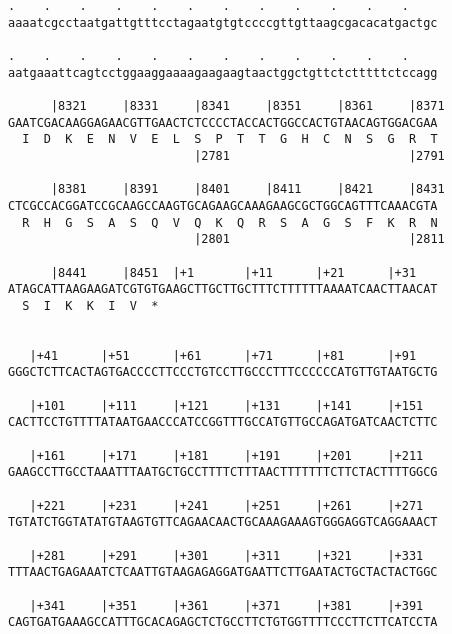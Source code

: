 \documentclass{article}
\begin{document}
\begin{Verbatim}
.    .    .    .    .    .    .    .    .    .    .    .    
aaaatcgcctaatgattgtttcctagaatgtgtccccgttgttaagcgacacatgactgc
                                                            
.    .    .    .    .    .    .    .    .    .    .    .    
aatgaaattcagtcctggaaggaaaagaagaagtaactggctgttctctttttctccagg
                                                            
      |8321     |8331     |8341     |8351     |8361     |8371
GAATCGACAAGGAGAACGTTGAACTCTCCCCTACCACTGGCCACTGTAACAGTGGACGAA
  I  D  K  E  N  V  E  L  S  P  T  T  G  H  C  N  S  G  R  T
                          |2781                         |2791
  
      |8381     |8391     |8401     |8411     |8421     |8431
CTCGCCACGGATCCGCAAGCCAAGTGCAGAAGCAAAGAAGCGCTGGCAGTTTCAAACGTA
  R  H  G  S  A  S  Q  V  Q  K  Q  R  S  A  G  S  F  K  R  N
                          |2801                         |2811
  
      |8441     |8451  |+1       |+11      |+21      |+31   
ATAGCATTAAGAAGATCGTGTGAAGCTTGCTTGCTTTCTTTTTTAAAATCAACTTAACAT
  S  I  K  K  I  V  *   
                                                            
  
   |+41      |+51      |+61      |+71      |+81      |+91   
GGGCTCTTCACTAGTGACCCCTTCCCTGTCCTTGCCCTTTCCCCCCATGTTGTAATGCTG
                                                            
   |+101     |+111     |+121     |+131     |+141     |+151  
CACTTCCTGTTTTATAATGAACCCATCCGGTTTGCCATGTTGCCAGATGATCAACTCTTC
                                                            
   |+161     |+171     |+181     |+191     |+201     |+211  
GAAGCCTTGCCTAAATTTAATGCTGCCTTTTCTTTAACTTTTTTTCTTCTACTTTTGGCG
                                                            
   |+221     |+231     |+241     |+251     |+261     |+271  
TGTATCTGGTATATGTAAGTGTTCAGAACAACTGCAAAGAAAGTGGGAGGTCAGGAAACT
                                                            
   |+281     |+291     |+301     |+311     |+321     |+331  
TTTAACTGAGAAATCTCAATTGTAAGAGAGGATGAATTCTTGAATACTGCTACTACTGGC
                                                            
   |+341     |+351     |+361     |+371     |+381     |+391  
CAGTGATGAAAGCCATTTGCACAGAGCTCTGCCTTCTGTGGTTTTCCCTTCTTCATCCTA
                                                            

\end{Verbatim}
\end{document}
